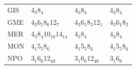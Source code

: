 \documentclass[11pt]{article}
\begin{document}
\begin{table}[htbp]
\begin{tabular}{llll}
GIS & 4\(_{\text{3}}\)\textbullet{}8\(_{\text{4}}\) & 4\(_{\text{3}}\)\textbullet{}8\(_{\text{4}}\) & 4\(_{\text{3}}\)\textbullet{}8\(_{\text{4}}\)\\
GME & 4\(_{\text{3}}\)\textbullet{}6\(_{\text{1}}\)\textbullet{}8\(_{\text{6}}\)\textbullet{}12\(_{\text{7}}\) & 4\(_{\text{3}}\)\textbullet{}6\(_{\text{1}}\)\textbullet{}8\(_{\text{2}}\)\textbullet{}12\(_{\text{1}}\) & 4\(_{\text{3}}\)\textbullet{}6\(_{\text{1}}\)\textbullet{}8\(_{\text{2}}\)\\
MER & 4\(_{\text{3}}\)\textbullet{}8\(_{\text{4}}\)\textbullet{}10\(_{\text{10}}\)\textbullet{}14\(_{\text{14}}\) & 4\(_{\text{3}}\)\textbullet{}8\(_{\text{4}}\) & 4\(_{\text{3}}\)\textbullet{}8\(_{\text{4}}\)\\
MON & 4\(_{\text{1}}\)\textbullet{}5\(_{\text{5}}\)\textbullet{}8\(_{\text{6}}\) & 4\(_{\text{1}}\)\textbullet{}5\(_{\text{5}}\)\textbullet{}8\(_{\text{6}}\) & 4\(_{\text{1}}\)\textbullet{}5\(_{\text{5}}\)\textbullet{}8\(_{\text{6}}\)\\
NPO & 3\(_{\text{1}}\)\textbullet{}6\(_{\text{6}}\)\textbullet{}12\(_{\text{40}}\) & 3\(_{\text{1}}\)\textbullet{}6\(_{\text{6}}\)\textbullet{}12\(_{\text{40}}\) & 3\(_{\text{1}}\)\textbullet{}6\(_{\text{6}}\)\\
\end{tabular}
\end{table}
\end{document}
